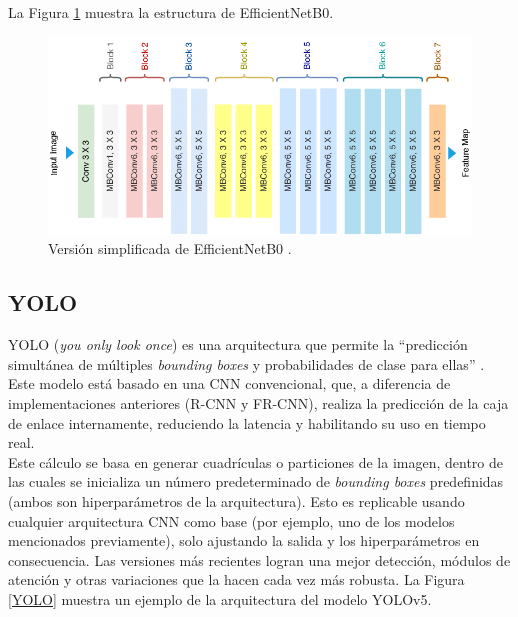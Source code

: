 La Figura \ref{EfficientNetB0} muestra la estructura de 
EfficientNetB0.

\begin{figure}[h!] 
    \includegraphics[width=1\textwidth]{images/EfficientNetB0.png} 
    \centering 
    \caption{Versión simplificada de EfficientNetB0 \protect\cite{EfficientNetB0}.} 
    \label{EfficientNetB0} 
\end{figure}

\subsection{YOLO} 
YOLO (\textit{you only look once}) es una arquitectura que 
permite la ``predicción simultánea de múltiples \textit{bounding boxes} 
y probabilidades de clase para ellas'' \cite{Redmon2015}. 
Este modelo está basado en una CNN convencional, que, a diferencia 
de implementaciones anteriores (R-CNN y FR-CNN), realiza la 
predicción de la caja de enlace internamente, reduciendo la latencia 
y habilitando su uso en tiempo real.\\

Este cálculo se basa en generar cuadrículas o particiones de la 
imagen, dentro de las cuales se inicializa un número predeterminado 
de \textit{bounding boxes} predefinidas (ambos son hiperparámetros de la 
arquitectura). Esto es replicable usando cualquier arquitectura 
CNN como base (por ejemplo, uno de los modelos mencionados previamente), 
solo ajustando la salida y los hiperparámetros en consecuencia. 
Las versiones más recientes logran una mejor detección, módulos de 
atención y otras variaciones que la hacen cada vez más robusta. 
La Figura \ref{YOLO} muestra un ejemplo de la arquitectura del modelo 
YOLOv5.

